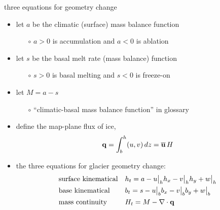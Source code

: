 \begin{frame}{three equations for geometry change}

\begin{itemize}
\item let $a$ be the climatic (surface) mass balance function
    \begin{itemize}
    \item[$\circ$] $a>0$ is accumulation and $a<0$ is ablation
    \end{itemize}
\item let $s$ be the basal melt rate (mass balance) function
    \begin{itemize}
    \item[$\circ$] $s>0$ is basal melting and $s<0$ is freeze-on
    \end{itemize}
\item let $M=a-s$
    \begin{itemize}
    \item[$\circ$] ``climatic-basal mass balance function'' in glossary
    \end{itemize}
\item define the map-plane flux of ice,
	$$\mathbf{q} = \int_{b}^{h} (u,v)\,dz = \overline{\mathbf{u}}\,H$$
\item the three equations for glacier geometry change:
\begin{align*}
&\text{surface kinematical} && h_t = a - u\big|_h h_x - v\big|_h h_y + w\big|_h  \\
&\text{base kinematical} && b_t = s - u\big|_b b_x - v\big|_b b_y + w\big|_b  \\
&\text{mass continuity} && H_t = M - \nabla\cdot \mathbf{q}
\end{align*}
\end{itemize}
\end{frame}


